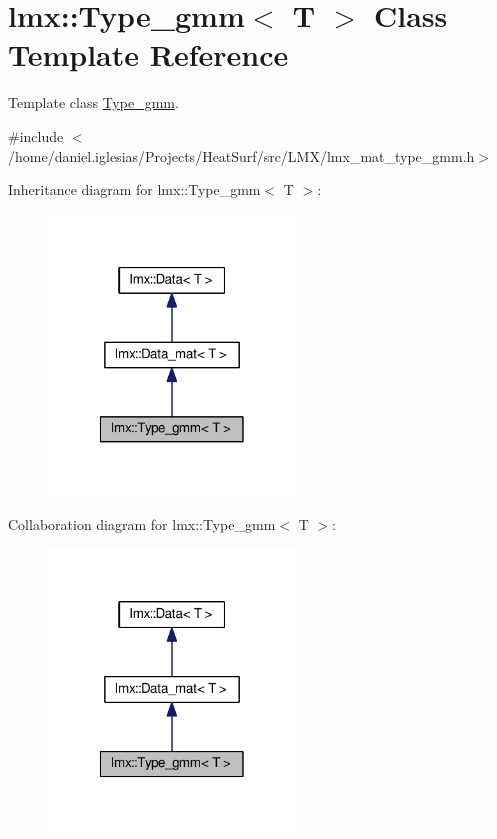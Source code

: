 \hypertarget{classlmx_1_1Type__gmm}{\section{lmx\-:\-:Type\-\_\-gmm$<$ T $>$ Class Template Reference}
\label{classlmx_1_1Type__gmm}
}


Template class \hyperlink{classlmx_1_1Type__gmm}{Type\-\_\-gmm}.  




{\ttfamily \#include $<$/home/daniel.\-iglesias/\-Projects/\-Heat\-Surf/src/\-L\-M\-X/lmx\-\_\-mat\-\_\-type\-\_\-gmm.\-h$>$}



Inheritance diagram for lmx\-:\-:Type\-\_\-gmm$<$ T $>$\-:
\nopagebreak
\begin{figure}[H]
\begin{center}
\leavevmode
\includegraphics[width=186pt]{classlmx_1_1Type__gmm__inherit__graph}
\end{center}
\end{figure}


Collaboration diagram for lmx\-:\-:Type\-\_\-gmm$<$ T $>$\-:
\nopagebreak
\begin{figure}[H]
\begin{center}
\leavevmode
\includegraphics[width=186pt]{classlmx_1_1Type__gmm__coll__graph}
\end{center}
\end{figure}

